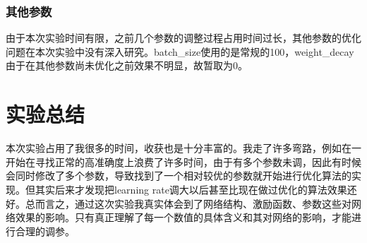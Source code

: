 \documentclass[11pt,utf8]{article}
\begin{document}
          \subsubsection*{其他参数}
            \indent 由于本次实验时间有限，之前几个参数的调整过程占用时间过长，其他参数的优化问题在本次实验中没有深入研究。batch\_size使用的是常规的100，weight\_decay由于在其他参数尚未优化之前效果不明显，故暂取为0。\\
        \section*{实验总结}
          \indent 本次实验占用了我很多的时间，收获也是十分丰富的。我走了许多弯路，例如在一开始在寻找正常的高准确度上浪费了许多时间，由于有多个参数未调，因此有时候会同时修改了多个参数，导致找到了一个相对较优的参数就开始进行优化算法的实现。但其实后来才发现把learning rate调大以后甚至比现在做过优化的算法效果还好。总而言之，通过这次实验我真实体会到了网络结构、激励函数、参数这些对网络效果的影响。只有真正理解了每一个数值的具体含义和其对网络的影响，才能进行合理的调参。\\
      
    
\end{document}
